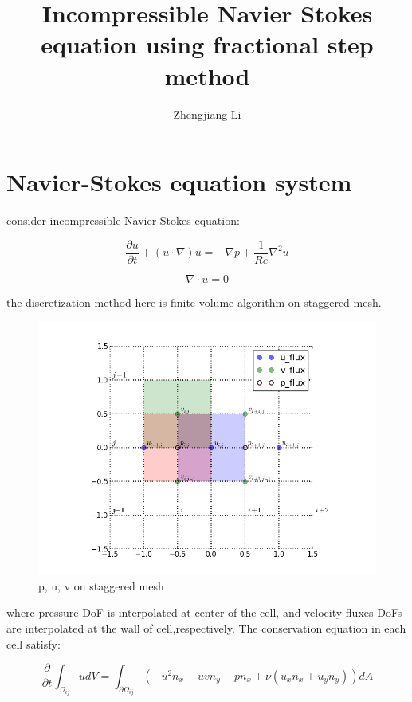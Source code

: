 \documentclass[11pt]{article}
\begin{document}
\title{Incompressible Navier Stokes equation using fractional step method}

\author{Zhengjiang Li}

\date{}

\maketitle

\section {Navier-Stokes equation system}

consider incompressible Navier-Stokes equation:

	$$ \frac{\partial u}{\partial t} + ( u \cdot \nabla) u = - \nabla p + \frac{1}{Re} \nabla^2 u $$

	$$ \nabla \cdot u = 0 $$

the discretization method here is finite volume algorithm on staggered mesh.

\begin{figure}[!h]
	\caption{p, u, v on staggered mesh}
	\centering
	\includegraphics{staggeredmesh}
\end{figure}

where pressure DoF is interpolated at center of the cell, and velocity fluxes DoFs are interpolated at the wall of cell,respectively. The conservation equation in each cell satisfy:

$$ \frac{\partial}{\partial t} \int _{\Omega _{ij}} u dV = \int_{\partial \Omega_{ij}} ( -u^2 n_x - u v n_y - p n_x + \nu (u_x n_x + u_y n_y) ) dA  $$
\end{document}
